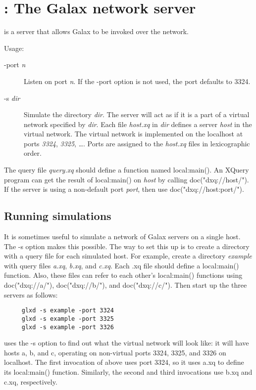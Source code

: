 \section{ : The Galax network server}

 is a server that allows Galax to be invoked over the  
network.

Usage: 

\begin{description}
\item[-port \emph{n}] Listen on port \emph{n}.  If the -port option is
   not used, the port defaults to 3324.
\item[-s \emph{dir}] Simulate the directory \emph{dir}.  The server
   will act as if it is a part of a virtual network specified by
   \emph{dir}.  Each file \emph{host.xq} in \emph{dir} defines a server
   \emph{host} in the virtual network.  The virtual network is
   implemented on the localhost at ports \emph{3324}, \emph{3325},
   \ldots.  Ports are assigned to the \emph{host.xq} files in
   lexicographic order.
\end{description}

The query file \emph{query.xq} should define a function named
local:main().  An XQuery program can get the result of local:main() on
\emph{host} by calling doc("dxq://host/").  If the server is using a
non-default port \emph{port}, then use doc("dxq://host:port/").

\subsection{Running simulations}
It is sometimes useful to simulate a network of Galax servers on a
single host.  The -s option makes this possible.  The way to set this
up is to create a directory with a query file for each simulated host.
For example, create a directory \emph{example} with query files
\emph{a.xq}, \emph{b.xq}, and \emph{c.xq}.  Each .xq file should
define a local:main() function.  Also, these files can refer to each
other's local:main() functions using doc("dxq://a/"), doc("dxq://b/"),
and doc("dxq://c/").  Then start up the three servers as follows:
\begin{verbatim}
     glxd -s example -port 3324
     glxd -s example -port 3325
     glxd -s example -port 3326
\end{verbatim}
 uses the -s option to find out what the virtual network
will look like: it will have hosts a, b, and c, operating on
non-virtual ports 3324, 3325, and 3326 on localhost.  The first
invocation of  above uses port 3324, so it uses a.xq to
define its local:main() function.  Similarly, the second and third
invocations use b.xq and c.xq, respectively.

